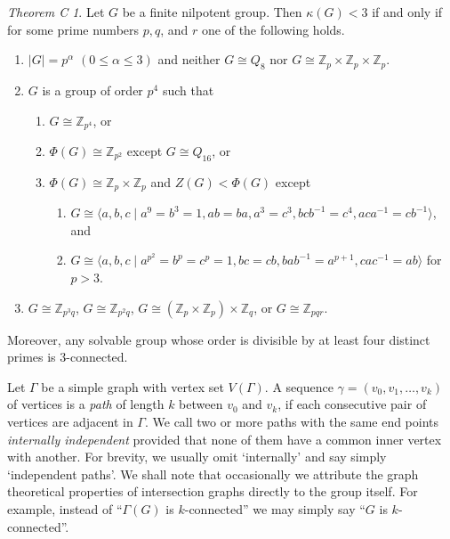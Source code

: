 \documentclass[a4paper,12pt]{article}
\theoremstyle{definition}
\theoremstyle{remark}
\theoremstyle{theorem}
\newtheorem*{theoremC}{Theorem C}
\begin{document}
\begin{theoremC}
  Let $G$ be a finite nilpotent group. Then $\kappa(G)<3$ if and only if for some prime numbers $p,q$, and $r$ one of the following holds.
  \begin{enumerate}
  \item $|G|=p^{\alpha}$ $(0\leq\alpha\leq 3)$ and neither
    $G\cong Q_8$ nor
    $G\cong \mathbb{Z}_p\times\mathbb{Z}_p\times\mathbb{Z}_p$.
  \item $G$ is a group of order $p^4$ such that
    \begin{enumerate}
    \item $G\cong \mathbb{Z}_{p^4}$, or
    \item $\Phi(G)\cong\mathbb{Z}_{p^2}$ except $G\cong Q_{16}$, or
    \item
      $\Phi(G)\cong\mathbb{Z}_p\times\mathbb{Z}_p$ and $Z(G)<\Phi(G)$
      except
      \begin{enumerate}
      \item $G\cong \langle a,b,c\mid a^9=b^3=1, ab=ba, a^3=c^3,
      bcb^{-1}=c^4, aca^{-1}=cb^{-1} \rangle $, and 
      \item $G\cong \langle a,b,c\mid a^{p^2}=b^p=c^p=1, bc=cb, bab^{-1}=a^{p+1}, cac^{-1}=ab \rangle$ for $p>3$. 
      \end{enumerate}      
    \end{enumerate}
  \item $G\cong\mathbb{Z}_{p^3q}$, $G\cong\mathbb{Z}_{p^2q}$,
    $G\cong(\mathbb{Z}_p\times\mathbb{Z}_p)\times\mathbb{Z}_q$, or
    $G\cong\mathbb{Z}_{pqr}$.
  \end{enumerate}
 Moreover, any solvable group whose order is divisible by at least four
  distinct primes is $3$-connected.
\end{theoremC}

Let $\Gamma$ be a simple graph with vertex set $V(\Gamma)$. A sequence $\gamma=(v_0,v_1,\dots,v_k)$ of vertices is a \emph{path} of length $k$ between $v_0$ and $v_k$, if each consecutive pair of vertices are adjacent in $\Gamma$. We call two or more paths with the same end points \emph{internally independent} provided that none of them have a common inner vertex with another. For brevity, we usually omit `internally' and say simply `independent paths'. We shall note that occasionally we attribute the graph theoretical properties of intersection graphs directly to the group itself. For example, instead of ``$\Gamma(G)$ is $k$-connected'' we may simply say ``$G$ is $k$-connected''. 
\end{document}
